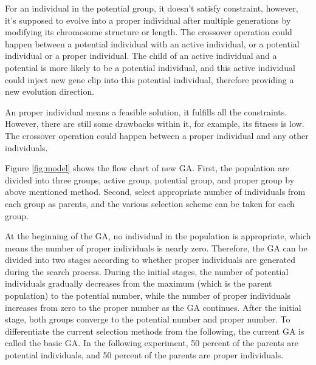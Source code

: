 For an individual in the potential group, it doesn't satisfy constraint,
however, it's supposed to evolve into a proper individual after multiple
generations by modifying its chromosome structure or length. The crossover
operation could happen between a potential individual with an active
individual, or a potential individual or a proper individual. The child of an
active individual and a potential is more likely to be a potential individual,
and this active individual could inject new gene clip into this potential
individual, therefore providing a new evolution direction. 


An proper individual means a feasible solution, it fulfills all the constraints. 
However, there are still some drawbacks within it, for example, its fitness is low.
The crossover operation  could happen between a proper individual and any other individuals.


Figure \ref{fig:model} shows the flow chart of new GA. First, the
population are divided into three groups, active group, potential group, and
proper group by above mentioned method. Second, select appropriate number of
individuals from each group as parents, and the various selection scheme can be
taken for each group. 


At the beginning of the GA, no individual in the population is appropriate, which means the number
of proper individuals is nearly zero. Therefore, the GA can be divided into two stages according to whether
proper individuals are generated during the search process. During the initial stages, the number of
potential individuals gradually decreases from the maximum (which is the parent population) to the potential
number, while the number of proper individuals increases from zero to the proper number as the GA
continues. After the initial stage, both groups converge to the
potential number and proper number. To differentiate the current selection methods from
the following, the current GA is called the basic GA. In the following experiment, 50 percent of the
parents are potential individuals, and 50 percent of the parents are proper individuals.


